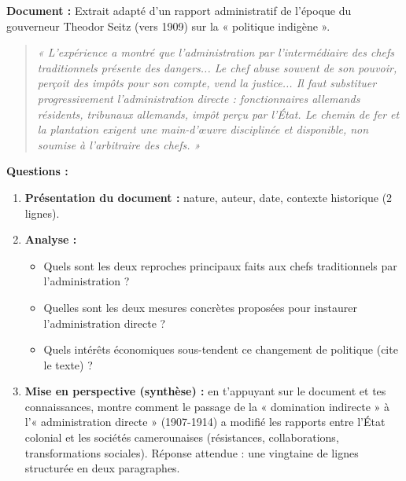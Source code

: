 \documentclass[11pt]{article}
\begin{document}
\begin{exercice}
\textbf{Document :} Extrait adapté d'un rapport administratif de l'époque du gouverneur Theodor Seitz (vers 1909) sur la « politique indigène ».
\begin{quote}
\textit{« L'expérience a montré que l'administration par l'intermédiaire des chefs traditionnels présente des dangers... Le chef abuse souvent de son pouvoir, perçoit des impôts pour son compte, vend la justice... Il faut substituer progressivement l'administration directe : fonctionnaires allemands résidents, tribunaux allemands, impôt perçu par l'État. Le chemin de fer et la plantation exigent une main-d'œuvre disciplinée et disponible, non soumise à l'arbitraire des chefs. »}
\end{quote}
\textbf{Questions :}
\begin{enumerate}
    \item \textbf{Présentation du document :} nature, auteur, date, contexte historique (2 lignes).
    \item \textbf{Analyse :}
    \begin{itemize}
        \item[a)] Quels sont les deux reproches principaux faits aux chefs traditionnels par l'administration ?
        \item[b)] Quelles sont les deux mesures concrètes proposées pour instaurer l'administration directe ?
        \item[c)] Quels intérêts économiques sous-tendent ce changement de politique (cite le texte) ?
    \end{itemize}
    \item \textbf{Mise en perspective (synthèse) :} en t'appuyant sur le document et tes connaissances, montre comment le passage de la « domination indirecte » à l'« administration directe » (1907-1914) a modifié les rapports entre l'État colonial et les sociétés camerounaises (résistances, collaborations, transformations sociales). Réponse attendue : une vingtaine de lignes structurée en deux paragraphes.
\end{enumerate}
\end{exercice}
\end{document}
